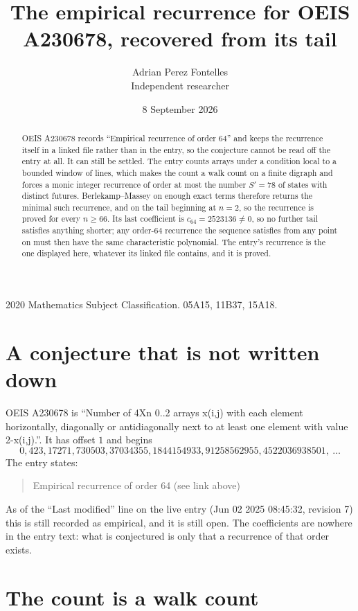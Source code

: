 \documentclass[11pt,a4paper]{article}
\title{The empirical recurrence for OEIS A230678, recovered from its tail}
\author{Adrian Perez Fontelles\\ \small Independent researcher}
\date{8 September 2026}
\theoremstyle{plain}
\theoremstyle{definition}
\begin{document}
\maketitle

\begin{abstract}
OEIS A230678 records ``Empirical recurrence of order $64$'' and keeps the recurrence itself in
a linked file rather than in the entry, so the conjecture cannot be read off the entry at all.
It can still be settled. The entry counts arrays under a condition local to a bounded window of
lines, which makes the count a walk count on a finite digraph and forces a monic integer
recurrence of order at most the number $S'=78$ of states with distinct futures. Berlekamp--Massey on
enough exact terms therefore returns the minimal such recurrence, and on the tail beginning at $n=2$, so the recurrence is proved for every $n\ge66$.
Its last coefficient is $c_{64}=2523136\neq0$, so no further tail satisfies anything
shorter; any order-$64$ recurrence the sequence satisfies from any point on must then have
the same characteristic polynomial. The entry's recurrence is the one displayed here, whatever
its linked file contains, and it is proved.
\end{abstract}

\noindent\small 2020 Mathematics Subject Classification. 05A15, 11B37, 15A18.\normalsize

\section{A conjecture that is not written down}

OEIS A230678 is ``Number of 4Xn 0..2 arrays x(i,j) with each element horizontally, diagonally or antidiagonally next to at least one element with value 2-x(i,j).''. It has offset $1$ and begins
\[
0, 423, 17271, 730503, 37034355, 1844154933, 91258562955, 4522036938501,\ \dots
\]
The entry states:
\begin{quote}
Empirical recurrence of order 64 (see link above)
\end{quote}
As of the ``Last modified'' line on the live entry (Jun 02 2025 08:45:32, revision 7)
this is still recorded as empirical, and it is still open. The coefficients are nowhere in the
entry text: what is conjectured is only that a recurrence of that order exists.

\section{The count is a walk count}
\end{document}
